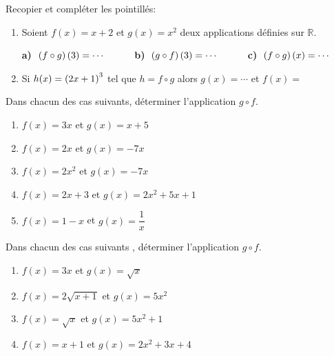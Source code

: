



	\begin{exercice}
Recopier et compléter  les pointillés:
\begin{enumerate}
\item Soient  $ f(x)=x+2$ et $ g(x)=x^2$ deux applications définies sur $ \mathbb{R} $.

\medskip
\textbf{a)} $\; \left(f \circ g\right)(3)=\cdots \hspace*{1cm}$ \textbf{b)}
$\;\left(g \circ f\right)(3) =\cdots\hspace*{1cm}$ \textbf{c)}
$\;\left(f \circ g\right)(x) =\cdots$
\item    Si  $ h(x)=\left(2x+1\right)^3 $ \; tel que $ h=f\circ g $ alors \;  $ g(x)= \cdots $ \; et $ f(x)= $
\end{enumerate}
\end{exercice}
\begin{exercice}
Dans chacun des cas suivants, déterminer l'application  $ g\circ f $.

\begin{enumerate}
\item  $ f(x)= 3x $ \; et\; $ g(x)=x+5 $


\item  $ f(x)= 2x $ \; et \; $ g(x)=-7x $


\item  $ f(x)= 2x^{2} $ \; et \; $ g(x)=-7x $


\item $ f(x)= 2x+3 $ \; et\; $ g(x)=2x^{2}+5x+1 $


\item $ f(x)= 1-x $ \;  et  \;$ g(x)=\dfrac{1}{x} $

\end{enumerate}

\end{exercice}



\begin{exercice}
 Dans chacun des cas suivants , déterminer l'application  $ g\circ f $.

\begin{enumerate}
\item  $ f(x)= 3x $ \; et \;$ g(x)=\sqrt{x} $


\item $ f(x)= 2\sqrt{x+1} $ \; et\;  $ g(x)=5x^{2} $


\item $ f(x)= \sqrt{x} $ \; et\;  $ g(x)=5x^{2}+1 $


\item $ f(x)= x+1 $\;  et  \; $ g(x)=2x^{2} +3x+4$

\end{enumerate}

\end{exercice}


